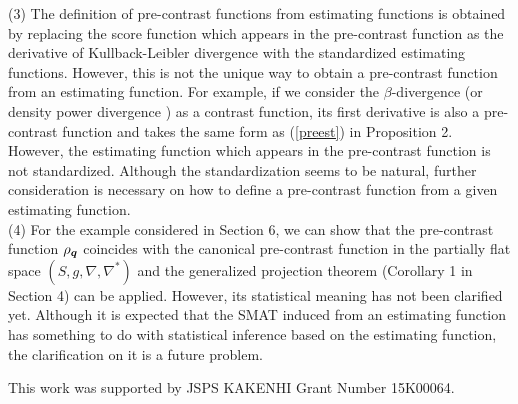 \documentclass[graybox]{svmult}
\newcommand{\bms}[1]{\mbox{\scriptsize\boldmath $#1$}}
\begin{document}
%
(3) The definition of pre-contrast functions from estimating functions is obtained by replacing
    the score function which appears in the pre-contrast function as the derivative of
    Kullback-Leibler divergence with the standardized estimating functions.
    However, this is not the unique way to obtain a pre-contrast function from an estimating
    function. For example, if we consider the $\beta$-divergence \cite{EK} (or density power
    divergence \cite{BHHJ}) as a contrast function, its first derivative is also a pre-contrast
    function and takes the same form as (\ref{preest}) in Proposition 2.
    However, the estimating function which appears in the pre-contrast function is not
    standardized. Although the standardization seems to be natural, further consideration is
    necessary on how to define a pre-contrast function from a given estimating function. 
    \vspace{2mm} \\
%
(4) For the example considered in Section 6,  we can show that the pre-contrast function
     $\rho_{\bms{q}}$ coincides with the canonical pre-contrast function in the partially flat
     space $(S,g,\nabla,\nabla^{\ast})$ and the generalized projection theorem (Corollary 1 
     in Section 4) can be applied. However, its statistical meaning has not been clarified yet. 
     Although it is expected that the SMAT induced from an estimating function has something
     to do with statistical inference based on the estimating function, the clarification on it is 
     a future problem.

\begin{acknowledgement}
This work was supported by JSPS KAKENHI Grant Number 15K00064.
\end{acknowledgement}
\end{document}
